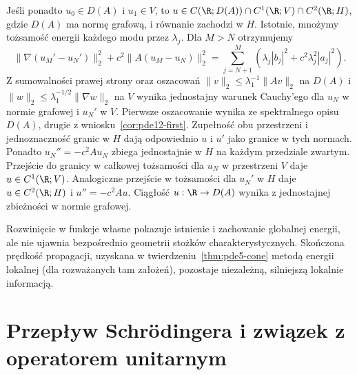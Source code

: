 \begin{uwaga}
Jeśli ponadto $u_0\in D(A)$ i $u_1\in V$, to
$u\in C(\R;D(A))\cap C^1(\R;V)\cap C^2(\R;H)$,
gdzie $D(A)$ ma normę grafową, i równanie zachodzi w $H$. Istotnie, mnożymy tożsamość
energii każdego modu przez $\lambda_j$.
Dla $M>N$ otrzymujemy
\[
 \|\nabla(u_M'-u_N')\|_2^2+
 c^2\|A(u_M-u_N)\|_2^2
 =\sum_{j=N+1}^M(\lambda_j|b_j|^2+
 c^2\lambda_j^2|a_j|^2).
\]
Z sumowalności prawej strony oraz oszacowań
$\|v\|_2\le\lambda_1^{-1}\|Av\|_2$ na $D(A)$
i $\|w\|_2\le\lambda_1^{-1/2}\|\nabla w\|_2$ na $V$
wynika jednostajny warunek Cauchy'ego dla $u_N$
w normie grafowej i $u_N'$ w $V$.
Pierwsze oszacowanie wynika ze spektralnego opisu $D(A)$,
drugie z wniosku~\ref{cor:pde12-first}.
Zupełność obu przestrzeni i jednoznaczność granic w $H$
dają odpowiednio $u$ i $u'$ jako granice w tych normach.
Ponadto $u_N''=-c^2Au_N$ zbiega jednostajnie w $H$
na każdym przedziale zwartym. Przejście do granicy w całkowej tożsamości dla $u_N$
w przestrzeni $V$ daje $u\in C^1(\R;V)$.
Analogiczne przejście w tożsamości dla $u_N'$ w $H$
daje $u\in C^2(\R;H)$ i $u''=-c^2Au$.
Ciągłość $u:\R\to D(A)$ wynika z jednostajnej
zbieżności w normie grafowej.
\end{uwaga}

\begin{uwaga}
Rozwinięcie w funkcje własne pokazuje istnienie i
zachowanie globalnej energii, ale nie ujawnia bezpośrednio
geometrii stożków charakterystycznych. Skończona prędkość
propagacji, uzyskana w twierdzeniu~\ref{thm:pde5-cone}
metodą energii lokalnej (dla rozważanych tam założeń),
pozostaje niezależną, silniejszą lokalnie informacją.
\end{uwaga}

\section{Przepływ Schrödingera i związek z operatorem unitarnym}
\label{sec:pde12-schroedinger}

